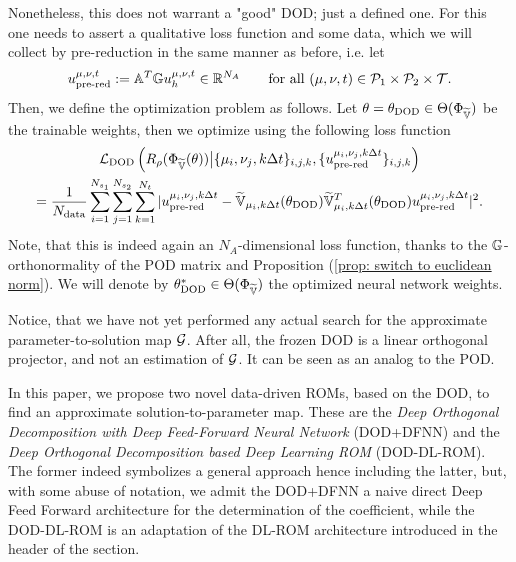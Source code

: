 Nonetheless, this does not warrant a "good" DOD; just a defined one. 
For this one needs to assert a qualitative loss function and some data, which we will collect by pre-reduction
in the same manner as before, i.e. let
\begin{equation*}
    u_\text{pre-red}^{\mu, \nu, t} := \mathbb{A}^T \mathbb{G} u_h^{\mu, \nu, t} \in \mathbb{R}^{N_A} \qquad \text{for all } (\mu, \nu, t) \in \mathcal{P}_1 \times \mathcal{P}_2 \times \mathcal{T}.
\end{equation*}
Then, we define the optimization problem as follows. Let $\theta = \theta_\text{DOD} 
\in \Theta(\Phi_{\widetilde{\mathbb{V}}})$ be the trainable weights, then we optimize using the following loss function
\begin{multline} \label{eq: loss dod}
    \mathcal{L}_\text{DOD}\left(R_\rho(\Phi_{\widetilde{\mathbb{V}}}(\theta)) \big\vert \{\mu_i, \nu_j, k \Delta t\}_{i,j,k}, 
    \{u_\text{pre-red}^{\mu_i, \nu_j, k \Delta t} \}_{i,j,k}\right) \\
    = \frac{1}{N_\text{data}}\sum_{i=1}^{N_{s_1}} \sum_{j=1}^{N_{s_2}} 
    \sum_{k = 1}^{N_t} \, \lvert u_\text{pre-red}^{\mu_i, \nu_j, k \Delta t} - 
    \widetilde{\mathbb{V}}_{\mu_i, k \Delta t}(\theta_\text{DOD}) \widetilde{\mathbb{V}}^T_{\mu_i, k \Delta t}(\theta_\text{DOD}) 
    u_\text{pre-red}^{\mu_i, \nu_j, k \Delta t} \rvert^2.
\end{multline}
Note, that this is indeed again an $N_A$-dimensional loss function, thanks to the $\mathbb{G}$-orthonormality
of the POD matrix and Proposition (\ref{prop: switch to euclidean norm}).
We will denote by $\theta_\text{DOD}^* \in \Theta(\Phi_{\widetilde{\mathbb{V}}})$ the optimized neural network weights.

Notice, that we have not yet performed any actual search for the approximate parameter-to-solution map $\mathcal{G}$. 
After all, the frozen DOD is a linear orthogonal projector, and not an estimation of $\mathcal{G}$. It can be seen
as an analog to the POD.

In this paper, we propose two novel data-driven ROMs, based on the DOD, to find an approximate solution-to-parameter 
map. These are the \emph{Deep Orthogonal Decomposition with Deep Feed-Forward Neural Network} (DOD+DFNN) and the
\emph{Deep Orthogonal Decomposition based Deep Learning ROM} (DOD-DL-ROM). The former indeed symbolizes a general 
approach hence including the latter, but, with some abuse of notation, we admit the DOD+DFNN a naive direct
Deep Feed Forward architecture for the determination of the coefficient, while the DOD-DL-ROM is an adaptation
of the DL-ROM architecture introduced in the header of the section.

